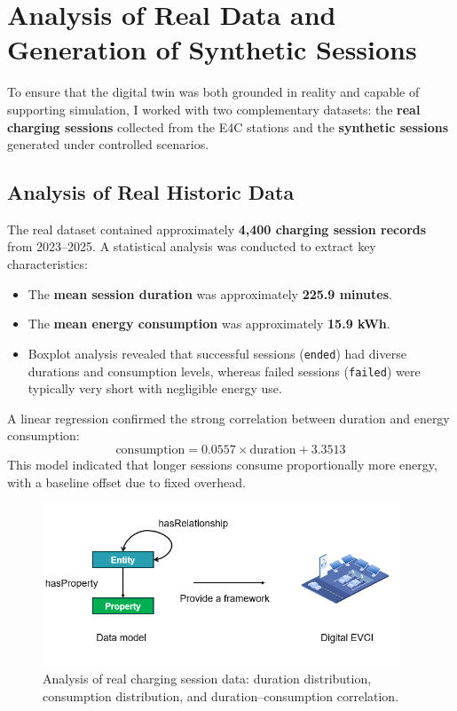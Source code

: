 \section{Analysis of Real Data and Generation of Synthetic Sessions}

To ensure that the digital twin was both grounded in reality and capable of supporting simulation, I worked with two complementary datasets: the \textbf{real charging sessions} collected from the E4C stations and the \textbf{synthetic sessions} generated under controlled scenarios.

\subsection*{Analysis of Real Historic Data}
The real dataset contained approximately \textbf{4,400 charging session records} from 2023–2025.  
A statistical analysis was conducted to extract key characteristics:

\begin{itemize}
    \item The \textbf{mean session duration} was approximately \textbf{225.9 minutes}.
    \item The \textbf{mean energy consumption} was approximately \textbf{15.9 kWh}.
    \item Boxplot analysis revealed that successful sessions (\texttt{ended}) had diverse durations and consumption levels, whereas failed sessions (\texttt{failed}) were typically very short with negligible energy use.
\end{itemize}

A linear regression confirmed the strong correlation between duration and energy consumption:
\[
    \text{consumption} = 0.0557 \times \text{duration} + 3.3513
\]
This model indicated that longer sessions consume proportionally more energy, with a baseline offset due to fixed overhead.

\begin{figure}[ht!]
    \centering
    \includegraphics[width=0.95\textwidth]{Images/data-model.png}
    \caption{Analysis of real charging session data: duration distribution, consumption distribution, and duration–consumption correlation.}
    \label{fig:real_data_analysis}
\end{figure}

